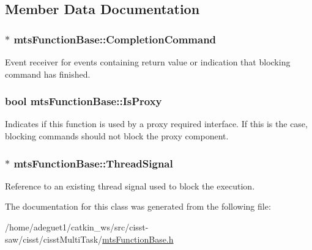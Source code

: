 \subsection{Member Data Documentation}
\hypertarget{classmts_function_base_aac5ad76cb069380fab633207c162f8d7}{
\subsubsection[{Completion\-Command}]{$\ast$ mts\-Function\-Base\-::\-Completion\-Command\hspace{0.3cm}{\ttfamily [protected]}}}\label{classmts_function_base_aac5ad76cb069380fab633207c162f8d7}
Event receiver for events containing return value or indication that blocking command has finished. \hypertarget{classmts_function_base_a9133290975dc1a3e0880bd72c5f975dc}{
\subsubsection[{Is\-Proxy}]{\setlength{\rightskip}{0pt plus 5cm}bool mts\-Function\-Base\-::\-Is\-Proxy\hspace{0.3cm}{\ttfamily [protected]}}}\label{classmts_function_base_a9133290975dc1a3e0880bd72c5f975dc}
Indicates if this function is used by a proxy required interface. If this is the case, blocking commands should not block the proxy component. \hypertarget{classmts_function_base_a82055587f9a8d1d159c9b82da0bd7a16}{
\subsubsection[{Thread\-Signal}]{$\ast$ mts\-Function\-Base\-::\-Thread\-Signal\hspace{0.3cm}{\ttfamily [protected]}}}\label{classmts_function_base_a82055587f9a8d1d159c9b82da0bd7a16}
Reference to an existing thread signal used to block the execution. 

The documentation for this class was generated from the following file\-:\begin{DoxyCompactItemize}
\item 
/home/adeguet1/catkin\-\_\-ws/src/cisst-\/saw/cisst/cisst\-Multi\-Task/\hyperlink{mts_function_base_8h}{mts\-Function\-Base.\-h}\end{DoxyCompactItemize}
